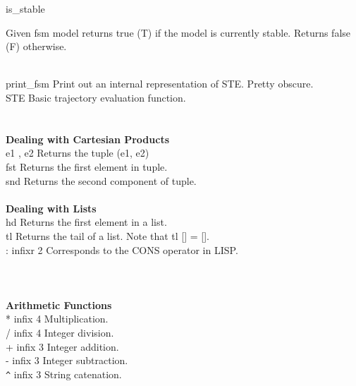 \begin{tabbing}
is\_stable           \>\>\parbox[t]{4.5in}{Given fsm model returns true (T) if the model is currently stable. Returns false (F) otherwise.}\\
print\_fsm       \>\>Print out an internal representation of STE. Pretty obscure.\\
STE             \>\>Basic trajectory evaluation function.\\
\\
\\
{\bf Dealing with Cartesian Products}\\
e1 , e2 \>\>Returns the tuple (e1, e2)\\
fst     \>\>Returns the first element in tuple.\\
snd       \>\>Returns the second component of tuple.\\
\\
{\bf Dealing with Lists}\\
hd        \>\>Returns the first element in a list.\\
tl            \>\>Returns the tail of a list. Note that tl [] = [].\\
: \>infixr 2  \>Corresponds to the CONS operator in LISP.\\
\\
\\
\\
{\bf Arithmetic Functions}\\
*       \>infix 4 \>Multiplication.\\
/       \>infix 4 \>Integer division.\\
+       \>infix 3 \>Integer addition.\\
-       \>infix 3 \>Integer subtraction.\\
\verb!^!       \>infix 3 \>String catenation.
\end{tabbing}
